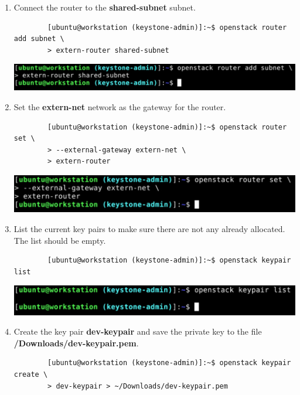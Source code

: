 \documentclass[letterpaper, 12pt]{article}
\begin{document}
\begin{enumerate}
    \item Connect the router to the \textbf{shared-subnet} subnet.
    \begin{lstlisting}
        [ubuntu@workstation (keystone-admin)]:~$ openstack router add subnet \
        > extern-router shared-subnet
    \end{lstlisting}

    \begin{center}
        \includegraphics[width=\linewidth]{images/part1/step18.png}
    \end{center}

    \item Set the \textbf{extern-net} network as the gateway for the router.
    \begin{lstlisting}
        [ubuntu@workstation (keystone-admin)]:~$ openstack router set \
        > --external-gateway extern-net \
        > extern-router
    \end{lstlisting}

    \begin{center}
        \includegraphics[width=\linewidth]{images/part1/step19.png}
    \end{center}

    \item List the current key pairs to make sure there are not any already allocated.
    The list should be empty.
    \begin{lstlisting}
        [ubuntu@workstation (keystone-admin)]:~$ openstack keypair list
    \end{lstlisting}

    \begin{center}
        \includegraphics[width=\linewidth]{images/part1/step20.png}
    \end{center}

    \item Create the key pair \textbf{dev-keypair} and save the private key to the file
    \textbf{\texttildemid/Downloads/dev-keypair.pem}.
    \begin{lstlisting}
        [ubuntu@workstation (keystone-admin)]:~$ openstack keypair create \
        > dev-keypair > ~/Downloads/dev-keypair.pem
    \end{lstlisting}


\end{enumerate}
\end{document}
